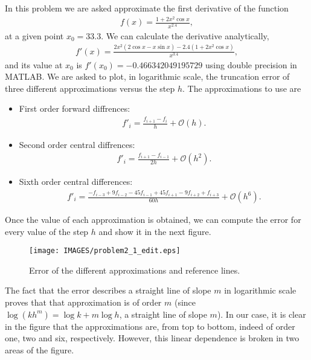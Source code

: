 \begin{solution}
In this problem we are asked approximate the first derivative of the function
\begin{align*}
f(x)=\frac{1+2x^2\cos{x}}{x^{2.4}},
\end{align*}
at a given point $x_0=33.3$. We can calculate the derivative analytically,
\begin{align*}
f'(x)=\frac{2x^2(2\cos{x}-x\sin{x})-2.4(1+2x^2\cos{x})}{x^{3.4}},
\end{align*}
and its value at $x_0$ is $f'(x_0)=-0.466342049195729$ using double precision in \textsc{MATLAB}. We are asked to plot, in logarithmic scale, the truncation error of three different approximations versus the step $h$. The approximations to use are
\begin{itemize}
\item First order forward diffrences:
\begin{align*}
f'_i=\frac{f_{i+1}-f_i}{h}+\mathcal{O}(h).
\end{align*}
\item Second order central diffrences:
\begin{align*}
f'_i=\frac{f_{i+1}-f_{i-1}}{2h}+\mathcal{O}(h^2).
\end{align*}
\item Sixth order central differences:
\begin{align*}
f'_i=\frac{-f_{i-3}+9f_{i-2}-45f_{i-1}+45f_{i+1}-9f_{i+2}+f_{i+3}}{60h}+\mathcal{O}(h^6).
\end{align*}
\end{itemize}
Once the value of each approximation is obtained, we can compute the error for every value of the step $h$ and show it in the next figure.
\begin{figure}[H]
\centering     %
\hspace{-0.56in}
\texttt{[image: IMAGES/problem2\_1\_edit.eps]}\caption{Error of the different approximations and reference lines.}
\end{figure}

The fact that the error describes a straight line of slope $m$ in logarithmic scale proves that that approximation is of order $m$ (since $\log{(kh^m)}=\log{k}+m\log h$, a straight line of slope $m$). In our case, it is clear in the figure that the approximations are, from top to bottom, indeed of order one, two and six, respectively. However, this linear dependence is broken in two areas of the figure. 


\end{solution}
